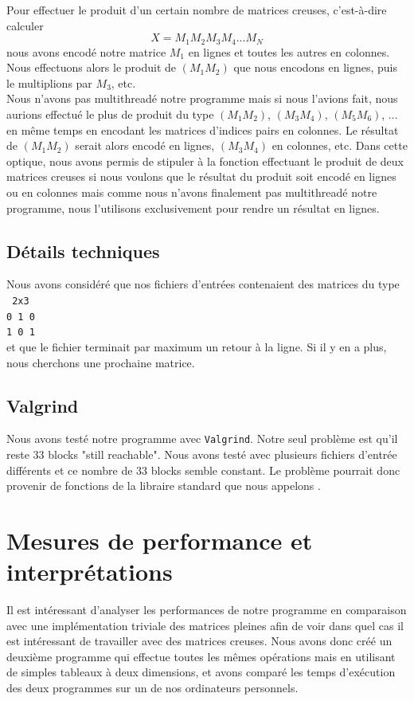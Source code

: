 \documentclass[12pt,a4paper]{article}
\begin{document}
Pour effectuer le produit d'un certain nombre de matrices creuses, c'est-à-dire calculer $$X = M_1 M_2 M_3 M_4 ... M_N$$
nous avons encodé notre matrice $M_1$ en lignes et toutes les autres en colonnes. Nous effectuons alors le produit de $(M_1 M_2)$ que nous encodons en lignes, puis le multiplions par $M_3$, etc.\\

Nous n'avons pas multithreadé notre programme mais si nous l'avions fait, nous aurions effectué le plus de produit du type $(M_1 M_2)$, $(M_3 M_4)$, $(M_5 M_6)$, ... en même temps en encodant les matrices d'indices pairs en colonnes. Le résultat de $(M_1 M_2)$ serait alors encodé en lignes, $(M_3 M_4)$ en colonnes, etc. Dans cette optique, nous avons permis de stipuler à la fonction effectuant le produit de deux matrices creuses si nous voulons que le résultat du produit soit encodé en lignes ou en colonnes mais comme nous n'avons finalement pas multithreadé notre programme, nous l'utilisons exclusivement pour rendre un résultat en lignes.

\subsection{Détails techniques}
Nous avons considéré que nos fichiers d'entrées contenaient des matrices du type\\
\texttt{
2x3\\
0 1 0 \\
1 0 1\\}
et que le fichier terminait par maximum un retour à la ligne. Si il y en a plus, nous cherchons une prochaine matrice.

\subsection{Valgrind}

Nous avons testé notre programme avec \texttt{Valgrind}. Notre seul problème est qu'il reste $33$ blocks "still reachable". Nous avons testé avec plusieurs fichiers d'entrée différents et ce nombre de 33 blocks semble constant. Le problème pourrait donc provenir de fonctions de la libraire standard que nous appelons .

\section{Mesures de performance et interprétations}

Il est intéressant d'analyser les performances de notre programme en comparaison avec une implémentation triviale des matrices pleines afin de voir dans quel cas il est intéressant de travailler avec des matrices creuses. Nous avons donc créé un deuxième programme qui effectue toutes les mêmes opérations mais en utilisant de simples tableaux à deux dimensions, et avons comparé les temps d'exécution des deux programmes sur un de nos ordinateurs personnels.
\end{document}

